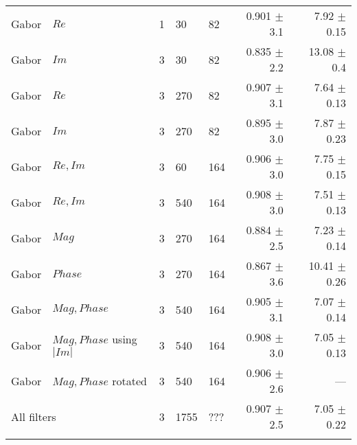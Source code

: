 \begin{tabularx}{\linewidth}{p{3cm} X X X X r r}
Gabor   & $Re$                      & 1 &    30 &  82   & 0.901 $\pm$ 3.1   & 7.92 $\pm$ 0.15 \\
Gabor   & $Im$                      & 3 &    30 &  82   & 0.835 $\pm$ 2.2   &13.08 $\pm$ 0.4  \\
Gabor   & $Re$                      & 3 &   270 &  82   & 0.907 $\pm$ 3.1   & 7.64 $\pm$ 0.13 \\
Gabor   & $Im$                      & 3 &   270 &  82   & 0.895 $\pm$ 3.0   & 7.87 $\pm$ 0.23 \\
Gabor   & $Re,Im$                   & 3 &    60 & 164   & 0.906 $\pm$ 3.0   & 7.75 $\pm$ 0.15 \\
Gabor   & $Re,Im$                   & 3 &   540 & 164   & 0.908 $\pm$ 3.0   & 7.51 $\pm$ 0.13 \\
Gabor   & $Mag$                     & 3 &   270 & 164   & 0.884 $\pm$ 2.5   & 7.23 $\pm$ 0.14 \\
Gabor   & $Phase$                   & 3 &   270 & 164   & 0.867 $\pm$ 3.6   &10.41 $\pm$ 0.26 \\
Gabor   & $Mag,Phase$               & 3 &   540 & 164   & 0.905 $\pm$ 3.1   & 7.07 $\pm$ 0.14 \\
Gabor   & $Mag, Phase$ using $|Im|$ & 3 &   540 & 164   & 0.908 $\pm$ 3.0   & 7.05 $\pm$ 0.13 \\
Gabor   & $Mag, Phase$ rotated      & 3 &   540 & 164   & 0.906 $\pm$ 2.6   & --- \\            

\midrule
\multicolumn{2}{l}{All filters}     & 3 &  1755 & ???   & 0.907 $\pm$ 2.5   & 7.05 $\pm$ 0.22 \\

\bottomrule
\noalign{\smallskip}
\end{tabularx}
